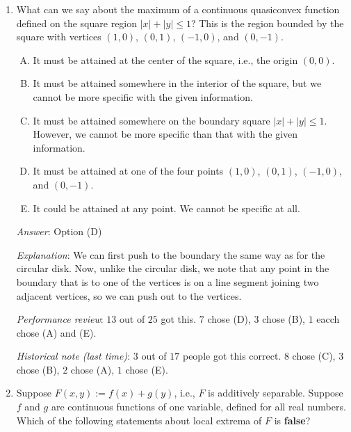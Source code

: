 \documentclass[10pt]{amsart}
\begin{document}
\begin{enumerate}
  {\em Historical note (last time)}: $8$ out of $17$ people got this
  correct. $5$ chose (B), $3$ chose (E), $1$ chose (D).

\item What can we say about the maximum of a continuous quasiconvex
  function defined on the square region $|x| + |y|\le 1$? This is the
  region bounded by the square with vertices $(1,0)$, $(0,1)$,
  $(-1,0)$, and $(0,-1)$.

  \begin{enumerate}[(A)]
  \item It must be attained at the center of the square, i.e., the
    origin $(0,0)$.
  \item It must be attained somewhere in the interior of the square, but
    we cannot be more specific with the given information.
  \item It must be attained somewhere on the boundary square $|x| +
    |y| \le 1$. However, we cannot be more specific than that with the
    given information.
  \item It must be attained at one of the four points $(1,0)$,
    $(0,1)$, $(-1,0)$, and $(0,-1)$. 
  \item It could be attained at any point. We cannot be specific at all.
  \end{enumerate}

  {\em Answer}: Option (D)

  {\em Explanation}: We can first push to the boundary the same way as
  for the circular disk. Now, unlike the circular disk, we note that
  any point in the boundary that is to one of the vertices is on a
  line segment joining two adjacent vertices, so we can push out to
  the vertices.

  {\em Performance review}: $13$ out of $25$ got this. $7$ chose (D),
  $3$ chose (B), $1$ eacch chose (A) and (E).

  {\em Historical note (last time)}: $3$ out of $17$ people got this
  correct. $8$ chose (C), $3$ chose (B), $2$ chose (A), $1$ chose (E).

\item Suppose $F(x,y) := f(x) + g(y)$, i.e., $F$ is additively
  separable. Suppose $f$ and $g$ are continuous functions of one
  variable, defined for all real numbers. Which of the following
  statements about local extrema of $F$ is {\bf false}?


\end{enumerate}
\end{document}
